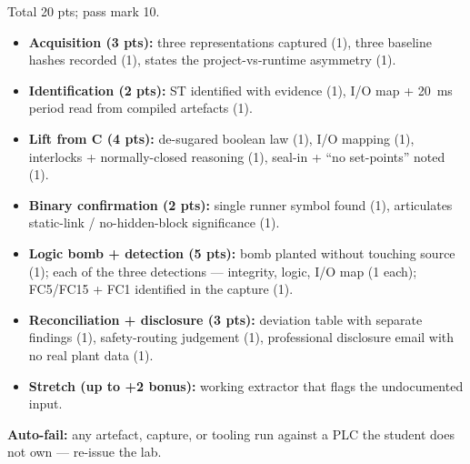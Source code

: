 \documentclass[11pt,a4paper]{article}
\begin{document}
\begin{rubricbox}
Total 20 pts; pass mark 10.
\begin{itemize}\setlength{\itemsep}{1pt}
  \item \textbf{Acquisition (3 pts):} three representations captured (1),
        three baseline hashes recorded (1), states the project-vs-runtime
        asymmetry (1).
  \item \textbf{Identification (2 pts):} ST identified with evidence (1),
        I/O map + 20~ms period read from compiled artefacts (1).
  \item \textbf{Lift from C (4 pts):} de-sugared boolean law (1), I/O
        mapping (1), interlocks + normally-closed reasoning (1), seal-in +
        ``no set-points'' noted (1).
  \item \textbf{Binary confirmation (2 pts):} single runner symbol found
        (1), articulates static-link / no-hidden-block significance (1).
  \item \textbf{Logic bomb + detection (5 pts):} bomb planted without
        touching source (1); each of the three detections --- integrity,
        logic, I/O map (1 each); FC5/FC15 + FC1 identified in the capture
        (1).
  \item \textbf{Reconciliation + disclosure (3 pts):} deviation table with
        separate findings (1), safety-routing judgement (1), professional
        disclosure email with no real plant data (1).
  \item \textbf{Stretch (up to +2 bonus):} working extractor that flags the
        undocumented input.
\end{itemize}
\textbf{Auto-fail:} any artefact, capture, or tooling run against a PLC the
student does not own --- re-issue the lab.
\end{rubricbox}
\end{document}
